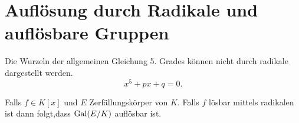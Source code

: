 \graphicspath{{Images/}}

\chapter{Auflösung durch Radikale und auflösbare Gruppen}

Die Wurzeln der allgemeinen Gleichung 5. Grades können nicht durch radikale dargestellt werden.
\[
x^{5} + px + q = 0
.\] 

\begin{theorem}[Galois]
	Falls $f \in K[x]$ und $E$ Zerfällungskörper von $K$.
	Falls $f$ lösbar mittels radikalen ist dann folgt,dass $\operatorname{Gal}(E/ K)$ auflösbar ist.
\end{theorem}

